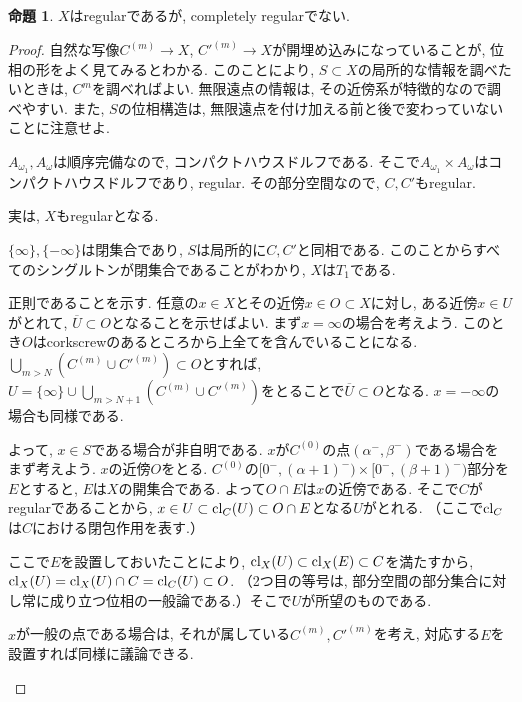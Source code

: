 \documentclass[a4paper, twoside]{bxjsarticle}
\theoremstyle{definition}
\newtheorem{prop}[thm]{命題}
\begin{document}
        \begin{prop}
            $X$はregularであるが, completely regularでない.
        \end{prop}
        \begin{proof}
            自然な写像$C^{(m)}\to X$, $C'^{(m)}\to X$が開埋め込みになっていることが, 位相の形をよく見てみるとわかる. このことにより, $S\subset X$の局所的な情報を調べたいときは, $C^{m}$を調べればよい. 無限遠点の情報は, その近傍系が特徴的なので調べやすい. また, $S$の位相構造は, 無限遠点を付け加える前と後で変わっていないことに注意せよ.
            
            $A_{\omega_1}, A_{\omega}$は順序完備なので, コンパクトハウスドルフである. そこで$A_{\omega_1}\times A_{\omega}$はコンパクトハウスドルフであり, regular. その部分空間なので, $C, C'$もregular. 
            
            実は, $X$もregularとなる.
            \begin{framed}
                $\{\infty\}, \{-\infty\}$は閉集合であり, $S$は局所的に$C, C'$と同相である. このことからすべてのシングルトンが閉集合であることがわかり, $X$は$T_1$である.
                
                正則であることを示す. 任意の$x\in X$とその近傍$x\in O\subset X$に対し, ある近傍$x\in U$がとれて, $\overline{U}\subset O$となることを示せばよい. まず$x=\infty$の場合を考えよう. このとき$O$はcorkscrewのあるところから上全てを含んでいることになる. $\bigcup_{m>N} (C^{(m)}\cup C'^{(m)})\subset O$とすれば, $U=\{\infty\}\cup\bigcup_{m>N+1} (C^{(m)}\cup C'^{(m)})$をとることで$\overline{U}\subset O$となる. $x=-\infty$の場合も同様である.
                
                よって, $x\in S$である場合が非自明である. $x$が$C^{(0)}$の点$(\alpha^-, \beta^-)$である場合をまず考えよう. $x$の近傍$O$をとる. $C^{(0)}$の$[0^-, (\alpha+1)^-)\times[0^-, (\beta+1)^-)$部分を$E$とすると, $E$は$X$の開集合である. よって$O\cap E$は$x$の近傍である. そこで$C$がregularであることから, $x\in U\subset {\rm cl}_C(U)\subset O\cap E$となる$U$がとれる. （ここで${\rm cl}_C$は$C$における閉包作用を表す.）
                
                ここで$E$を設置しておいたことにより, ${\rm cl}_X(U)\subset {\rm cl}_X(E)\subset C$を満たすから, ${\rm cl}_X(U)={\rm cl}_X(U)\cap C = {\rm cl}_C(U)\subset O$. （2つ目の等号は, 部分空間の部分集合に対し常に成り立つ位相の一般論である.）そこで$U$が所望のものである.
                
                $x$が一般の点である場合は, それが属している$C^{(m)}, C'^{(m)}$を考え, 対応する$E$を設置すれば同様に議論できる.
            \end{framed}
            

\end{proof}
\end{document}
